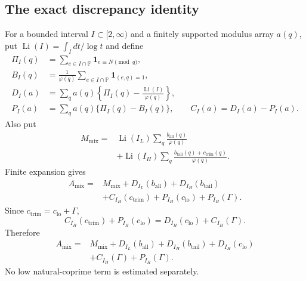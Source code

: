 \subsection{The exact discrepancy identity}

For a bounded interval \(I\subset[2,\infty)\) and a finitely supported
modulus array \(a(q)\), put \(\operatorname{Li}(I)=\int_I dt/\log t\)
and define
\begin{equation}\label{eq:ra-discrepancies}
\begin{aligned}
 \Pi_I(q)&=\sum_{e\in I\cap\mathbb P}\mathbf1_{e\equiv N\pmod q},\\
 B_I(q)&=\frac1{\varphi(q)}
             \sum_{e\in I\cap\mathbb P}\mathbf1_{(e,q)=1},\\
 D_I(a)&=\sum_q a(q)
       \left\{\Pi_I(q)-\frac{\operatorname{Li}(I)}{\varphi(q)}\right\},\\
 P_I(a)&=\sum_q a(q)\{\Pi_I(q)-B_I(q)\},\qquad
 C_I(a)=D_I(a)-P_I(a).
\end{aligned}
\end{equation}
Also put
\begin{equation}\label{eq:ra-main-mass}
\begin{aligned}
 M_{\mathrm{mix}}={}&\operatorname{Li}(I_L)
              \sum_q\frac{b_{\mathrm{all}}(q)}{\varphi(q)}\\
 &+\operatorname{Li}(I_H)
              \sum_q\frac{b_{\mathrm{tail}}(q)+c_{\mathrm{trim}}(q)}{\varphi(q)}.
\end{aligned}
\end{equation}
Finite expansion gives
\begin{equation}\label{eq:ra-b9}
\begin{aligned}
 A_{\mathrm{mix}}={}&M_{\mathrm{mix}}+D_{I_L}(b_{\mathrm{all}})
     +D_{I_H}(b_{\mathrm{tail}})\\
 &+C_{I_H}(c_{\mathrm{trim}})+P_{I_H}(c_{\mathrm{lo}})
     +P_{I_H}(\Gamma).
\end{aligned}
\end{equation}
Since \(c_{\mathrm{trim}}=c_{\mathrm{lo}}+\Gamma\),
\begin{equation}\label{eq:ra-cancellation}
 C_{I_H}(c_{\mathrm{trim}})+P_{I_H}(c_{\mathrm{lo}})
       =D_{I_H}(c_{\mathrm{lo}})+C_{I_H}(\Gamma).
\end{equation}
Therefore
\begin{equation}\label{eq:ra-b9-f1}
\begin{aligned}
 A_{\mathrm{mix}}={}&M_{\mathrm{mix}}+D_{I_L}(b_{\mathrm{all}})
     +D_{I_H}(b_{\mathrm{tail}})+D_{I_H}(c_{\mathrm{lo}})\\
 &+C_{I_H}(\Gamma)+P_{I_H}(\Gamma).
\end{aligned}
\end{equation}
No low natural-coprime term is estimated separately.

